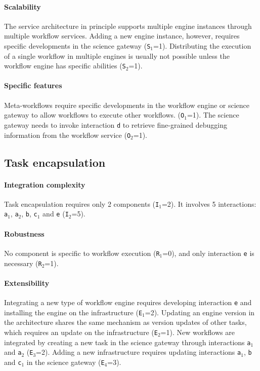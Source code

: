 \documentclass[preprint,3p,twocolumn]{elsarticle}
\newcommand{\correction}[1]{\color{blue}#1\color{black}\xspace}
\begin{document}
\paragraph{Scalability} The service architecture in principle supports
multiple engine instances through multiple workflow services. Adding a
new engine instance, however, requires specific developments in the science gateway
(\texttt{S$_1$}=1). Distributing the execution of a single workflow in multiple
engines is usually not possible unless the workflow engine has
specific abilities (\texttt{S$_2$}=1).

\paragraph{Specific features} Meta-workflows require specific
developments in the workflow engine or science gateway to allow
workflows to execute other workflows.  (\texttt{O$_1$}=1).
 The
science gateway needs to invoke interaction \texttt{d} to retrieve
fine-grained debugging information from the workflow service
(\texttt{O$_2$}=1).

\subsection{Task encapsulation}

\paragraph{Integration complexity} Task encapsulation requires only 2
components (\texttt{I$_1$}=2).  It involves 5 interactions:
\texttt{a$_1$}, \texttt{a$_2$}, \texttt{b}, \correction{\texttt{c$_1$}} and
\texttt{e} (\texttt{I$_2$}=5).

\paragraph{Robustness} No component is specific to workflow execution
(\texttt{R$_1$}=0), and only interaction \texttt{e} is necessary
(\texttt{R$_2$}=1).

\paragraph{Extensibility} Integrating a new type of workflow engine
requires developing interaction \texttt{e} and  installing the engine
on the infrastructure (\texttt{E$_1$}=2). Updating an engine version
in the architecture shares the same mechanism as version updates of
other tasks, which requires an update on the
infrastructure (\texttt{E$_2$}=1).  New workflows are integrated by
creating a new task in the science gateway through interactions
\texttt{a$_1$} and \texttt{a$_2$} (\texttt{E$_3$}=2). Adding a new
infrastructure requires updating interactions \texttt{a$_1$},
\texttt{b} and \correction{\texttt{c$_1$}} in the science gateway (\texttt{E$_4$}=3).
\end{document}
